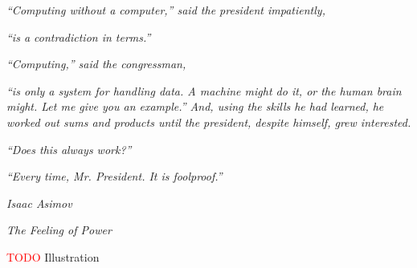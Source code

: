 
\thispagestyle{empty}\mbox{}

\vspace*{4cm}

\small

\hfill \emph{``Computing without a computer,'' said the president impatiently,}

\hfill \emph{``is a contradiction in terms.''}

\hfill

\hfill \emph{``Computing,'' said the congressman,}

\hfill \emph{``is only a system for handling data. A machine might do it, or the %
human brain might. Let me give you an example.'' And, using the skills he had %
learned, he worked out sums and products until the president, despite himself, %
grew interested.} 

\hfill 

\hfill \emph{``Does this always work?''}

\hfill \emph{``Every time, Mr. President. It is foolproof.''}

\hfill 

\hfill \emph{Isaac Asimov}

\hfill \emph{The Feeling of Power}

\textcolor{red}{TODO} Illustration

\newpage
\thispagestyle{empty}\mbox{}

\newpage

